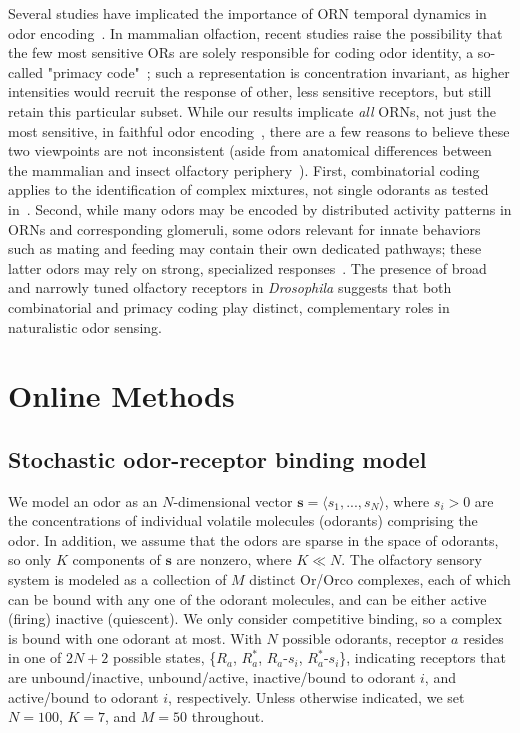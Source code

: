 Several studies have implicated the importance of ORN temporal dynamics in odor encoding~\cite{multiple_timescales_stopfer, primacy_coding, olfactory_coding_latency, chih-ying, martelli, odor_coding_rate_verhagen, neural_network_temporal_coding, dweck}. In mammalian olfaction, recent studies raise the possibility that the few most sensitive ORs are solely responsible for coding odor identity, a so-called "primacy code"~\cite{primacy_coding}; such a representation is concentration invariant, as higher intensities would recruit the response of other, less sensitive receptors, but still retain this particular subset. While our results implicate \textit{all} ORNs, not just the most sensitive, in faithful odor encoding~\cite{vijay_1}, there are a few reasons to believe these two viewpoints are not inconsistent (aside from anatomical differences between the mammalian and insect olfactory periphery~\cite{mammalian_olfaction}). First, combinatorial coding applies to the identification of complex mixtures, not single odorants as tested in~\cite{primacy_coding}. Second, while many odors may be encoded by distributed activity patterns in ORNs and corresponding glomeruli, some odors relevant for innate behaviors such as mating and feeding may contain their own dedicated pathways; these latter odors may rely on strong, specialized responses~\cite{dweck, evolution_insect_olfaction}. The presence of broad and narrowly tuned olfactory receptors in \textit{Drosophila} suggests that both combinatorial and primacy coding play distinct, complementary roles in naturalistic odor sensing. 







\section{Online Methods}

\subsection{Stochastic odor-receptor binding model}

We model an odor as an $N$-dimensional vector $\mathbf s = \langle s_1,...,s_N\rangle$, where $s_i > 0$ are the concentrations of individual volatile molecules (odorants) comprising the odor. In addition, we assume that the odors are sparse in the space of odorants, so only $K$ components of $\mathbf s$ are nonzero, where $K \ll N$. The olfactory sensory system is modeled as a collection of $M$ distinct Or/Orco complexes, each of which can be bound with any one of the odorant molecules, and can be either active (firing) inactive (quiescent). We only consider competitive binding, so a complex is bound with one odorant at most. With $N$ possible odorants, receptor $a$ resides in one of $2N+2$ possible states, \{$R_a$, $R^*_a$, $R_a$-$s_i$, $R^*_a$-$s_i$\}, indicating receptors that are unbound/inactive, unbound/active, inactive/bound to odorant $i$, and active/bound to odorant $i$, respectively. Unless otherwise indicated, we set $N = 100$, $K = 7$, and $M = 50$ throughout.

